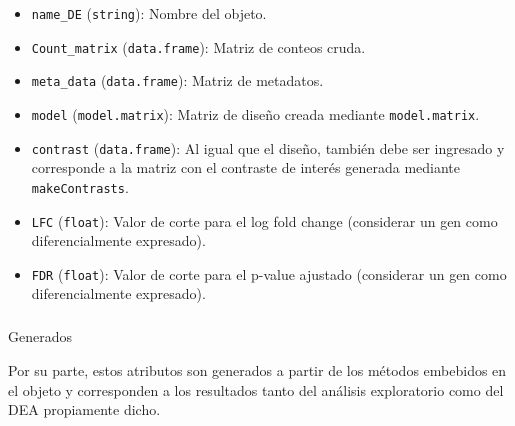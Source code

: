 \documentclass[
  10pt,
]{article}
\makeatletter
\let\oldsubparagraph\subparagraph
\renewcommand{\subparagraph}{
    \@ifstar
      \xxxSubParagraphStar
      \xxxSubParagraphNoStar
  }
\newcommand{\xxxSubParagraphStar}[1]{\oldsubparagraph*{#1}\mbox{}}
\newcommand{\xxxSubParagraphNoStar}[1]{\oldsubparagraph{#1}\mbox{}}
\makeatother
\begin{document}
\begin{itemize}
\item
  \texttt{name\_DE} (\texttt{string}): Nombre del objeto.
\item
  \texttt{Count\_matrix} (\texttt{data.frame}): Matriz de conteos cruda.
\item
  \texttt{meta\_data} (\texttt{data.frame}): Matriz de metadatos.
\item
  \texttt{model} (\texttt{model.matrix}): Matriz de diseño creada
  mediante \texttt{model.matrix}.
\item
  \texttt{contrast} (\texttt{data.frame}): Al igual que el diseño,
  también debe ser ingresado y corresponde a la matriz con el contraste
  de interés generada mediante \texttt{makeContrasts}.
\item
  \texttt{LFC} (\texttt{float}): Valor de corte para el log fold change
  (considerar un gen como diferencialmente expresado).
\item
  \texttt{FDR} (\texttt{float}): Valor de corte para el p-value ajustado
  (considerar un gen como diferencialmente expresado).
\end{itemize}

\subparagraph{Generados}\label{generados}

Por su parte, estos atributos son generados a partir de los métodos
embebidos en el objeto y corresponden a los resultados tanto del
análisis exploratorio como del DEA propiamente dicho.
\end{document}
